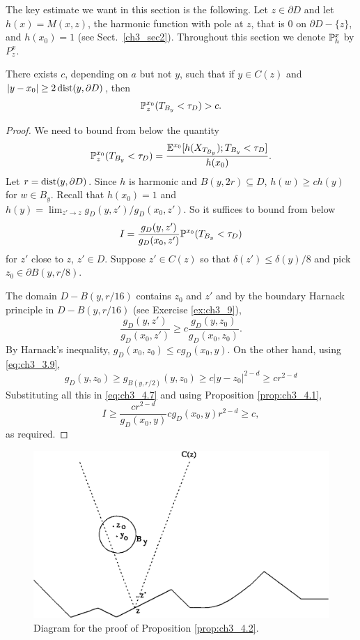 The key estimate we want in this section is the following. Let $z \in \partial D$ and let $h(x) = M(x,z)$, the harmonic function with pole at $z$, that is $0$ on $\partial D - \{z\}$, and $h(x_0) = 1$ (see Sect.\ \ref{ch3_sec2}). Throughout this section we denote $\P_h^x$ by $P^x_z$.

\begin{proposition}\label{prop:ch3_4.2}
There exists $c$, depending on $a$ but not $y$, such that if $y \in C(z)$ and $|y-x_0| \geq 2\dist(y,\partial D)$, then
\[
    \P_z^{x_0}(T_{B_y} < \tau_D) > c.
\]
\end{proposition}

\begin{proof}
We need to bound from below the quantity
\[
    \P_z^{x_0}(T_{B_y} < \tau_D) = \frac{\E^{x_0}[h(X_{T_{B_y}}); T_{B_y} < \tau_D]}{h(x_0)}.
\]
Let $r = \dist(y,\partial D)$. Since $h$ is harmonic and $B(y,2r) \subseteq D$, $h(w) \geq ch(y)$ for $w \in B_y$. Recall that $h(x_0) = 1$ and $h(y) = \lim_{z'\to z} g_D(y,z')/g_D(x_0,z')$. So it suffices to bound from below
\begin{equation}\label{eq:ch3_4.7}
    I = \frac{g_D(y,z')}{g_D(x_0,z')}\P^{x_0}(T_{B_y} < \tau_D)
\end{equation}
for $z'$ close to $z$, $z' \in D$. Suppose $z' \in C(z)$ so that $\delta(z') \leq \delta(y)/8$ and pick $z_0 \in \partial B(y,r/8)$.

The domain $D - B(y,r/16)$ contains $z_0$ and $z'$ and by the boundary Harnack principle in $D - B(y,r/16)$ (see Exercise \ref{ex:ch3_9}),
\[
    \frac{g_D(y,z')}{g_D(x_0,z')} \geq c\frac{g_D(y,z_0)}{g_D(x_0,z_0)}.
\]
By Harnack's inequality, $g_D(x_0,z_0) \leq cg_D(x_0,y)$. On the other hand, using \eqref{eq:ch3_3.9},
\[
    g_D(y,z_0) \geq g_{B(y,r/2)}(y,z_0) \geq c|y-z_0|^{2-d} \geq cr^{2-d}
\]
Substituting all this in \eqref{eq:ch3_4.7} and using Proposition \ref{prop:ch3_4.1},
\[
    I\geq \frac{cr^{2-d}}{g_D(x_0, y)}cg_D(x_0, y)r^{2-d}\geq c,
\]
as required.
\end{proof}

\smallskip
\begin{figure}[ht]
    \centering\includegraphics{Images/Img8.png}
    \bigskip
    \caption{Diagram for the proof of Proposition \ref{prop:ch3_4.2}.}
    \label{fig:ch3_4.1}
\end{figure}

